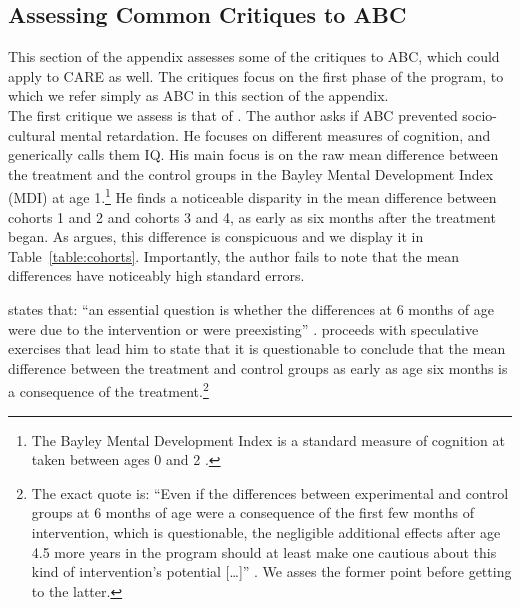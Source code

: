 \begin{appendices}
\setcounter{figure}{0}  \renewcommand{\thefigure}{D.\arabic{figure}}
\setcounter{table}{0}   \renewcommand{\thetable}{D.\arabic{table}}
\section{Assessing Common Critiques to ABC} \label{appendix:assessingcc}

\noindent This section of the appendix assesses some of the critiques to ABC, which could apply to CARE as well. The critiques focus on the first phase of the program, to which we refer simply as ABC in this section of the appendix.\\

\noindent The first critique we assess is that of \citet{Spitz_1992_ABC-Retardation}. The author asks if ABC prevented socio-cultural mental retardation. He focuses on different measures of cognition, and generically calls them IQ. His main focus is on the raw mean difference between the treatment and the control groups in the Bayley Mental Development Index (MDI) at age 1.\footnote{The Bayley Mental Development Index is a standard measure of cognition at taken between ages 0 and 2 \citep{Childrens-Health_2016_Bayley-Scales}.} He finds a noticeable disparity in the mean difference between cohorts 1 and 2 and cohorts 3 and 4, as early as six months after the treatment began. As \citet{Spitz_1992_ABC-Retardation} argues, this difference is conspicuous and we display it in Table~\ref{table:cohorts}. Importantly, the author fails to note that the mean differences have noticeably high standard errors.



\noindent \citet{Spitz_1992_ABC-Retardation} states that: ``an essential question is whether the differences at 6 months of age were due to the intervention or were preexisting'' \citep[][p. 230]{Spitz_1992_ABC-Retardation}. \citet{Spitz_1992_ABC-Retardation} proceeds with speculative exercises that lead him to state that it is questionable to conclude that the mean difference between the treatment and control groups as early as age six months is a consequence of the treatment.\footnote{The exact quote is: ``Even if the differences between experimental and control groups at 6 months of age were a consequence of the first few months of intervention, which is questionable, the negligible additional effects after age 4.5 more years in the program should at least make one cautious about this kind of intervention's potential [\ldots]'' \citep[][p. 235]{Spitz_1992_ABC-Retardation}. We asses the former point before getting to the latter.}\\


\end{appendices}
